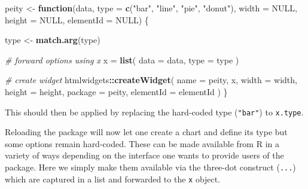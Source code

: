 \documentclass[
]{krantz}
\makeatletter
\newenvironment{Shaded}{\begin{snugshade}}{\end{snugshade}}
\newcommand{\AttributeTok}[1]{\textcolor[rgb]{0.61,0.61,0.61}{#1}}
\newcommand{\CommentTok}[1]{\textcolor[rgb]{0.37,0.37,0.37}{\textit{#1}}}
\newcommand{\ControlFlowTok}[1]{\textcolor[rgb]{0.27,0.27,0.27}{\textbf{#1}}}
\newcommand{\DataTypeTok}[1]{\textcolor[rgb]{0.27,0.27,0.27}{#1}}
\newcommand{\KeywordTok}[1]{\textcolor[rgb]{0.27,0.27,0.27}{\textbf{#1}}}
\newcommand{\NormalTok}[1]{#1}
\newcommand{\OperatorTok}[1]{\textcolor[rgb]{0.43,0.43,0.43}{\textbf{#1}}}
\newcommand{\OtherTok}[1]{\textcolor[rgb]{0.37,0.37,0.37}{#1}}
\newcommand{\StringTok}[1]{\textcolor[rgb]{0.5,0.5,0.5}{#1}}
\newcommand{\VariableTok}[1]{\textcolor[rgb]{0,0,0}{#1}}
\newenvironment{kframe}{%
\medskip{}
\setlength{\fboxsep}{.8em}
 \def\at@end@of@kframe{}%
 \ifinner\ifhmode%
  \def\at@end@of@kframe{\end{minipage}}%
  \begin{minipage}{\columnwidth}%
 \fi\fi%
 \def\FrameCommand##1{\hskip\@totalleftmargin \hskip-\fboxsep
 \colorbox{shadecolor}{##1}\hskip-\fboxsep
     \hskip-\linewidth \hskip-\@totalleftmargin \hskip\columnwidth}%
 \MakeFramed {\advance\hsize-\width
   \@totalleftmargin\z@ \linewidth\hsize
   \@setminipage}}%
 {\par\unskip\endMakeFramed%
 \at@end@of@kframe}
\renewenvironment{Shaded}{\begin{kframe}}{\end{kframe}}
\makeatother
\begin{document}
\begin{Shaded}
\begin{Highlighting}[]
\NormalTok{peity <{-}}\StringTok{ }\ControlFlowTok{function}\NormalTok{(data, }\DataTypeTok{type =} \KeywordTok{c}\NormalTok{(}\StringTok{"bar"}\NormalTok{, }\StringTok{"line"}\NormalTok{, }\StringTok{"pie"}\NormalTok{, }\StringTok{"donut"}\NormalTok{), }
  \DataTypeTok{width =} \OtherTok{NULL}\NormalTok{, }\DataTypeTok{height =} \OtherTok{NULL}\NormalTok{, }\DataTypeTok{elementId =} \OtherTok{NULL}\NormalTok{) \{}

\NormalTok{  type <{-}}\StringTok{ }\KeywordTok{match.arg}\NormalTok{(type)}

  \CommentTok{\# forward options using x}
\NormalTok{  x =}\StringTok{ }\KeywordTok{list}\NormalTok{(}
    \DataTypeTok{data =}\NormalTok{ data,}
    \DataTypeTok{type =}\NormalTok{ type}
\NormalTok{  )}

  \CommentTok{\# create widget}
\NormalTok{  htmlwidgets}\OperatorTok{::}\KeywordTok{createWidget}\NormalTok{(}
    \DataTypeTok{name =} \StringTok{\textquotesingle{}peity\textquotesingle{}}\NormalTok{,}
\NormalTok{    x,}
    \DataTypeTok{width =}\NormalTok{ width,}
    \DataTypeTok{height =}\NormalTok{ height,}
    \DataTypeTok{package =} \StringTok{\textquotesingle{}peity\textquotesingle{}}\NormalTok{,}
    \DataTypeTok{elementId =}\NormalTok{ elementId}
\NormalTok{  )}
\NormalTok{\}}
\end{Highlighting}
\end{Shaded}

This should then be applied by replacing the hard-coded type (\texttt{"bar"}) to \texttt{x.type}.

\begin{Shaded}
\end{Shaded}

Reloading the package will now let one create a chart and define its type but some options remain hard-coded. These can be made available from R in a variety of ways depending on the interface one wants to provide users of the package. Here we simply make them available via the three-dot construct (\texttt{...}) which are captured in a list and forwarded to the \texttt{x} object.
\end{document}
